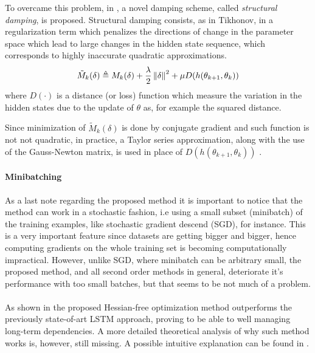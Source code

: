 To overcame this problem, in \cite{hessianFree}, a novel damping scheme, called \textit{structural damping}, is proposed.
Structural damping consists, as in Tikhonov, in a regularization term which  penalizes the directions of change in the parameter space which lead to large changes in the hidden state sequence, which corresponds to highly inaccurate quadratic approximations.
\begin{equation}
 \tilde{M}_k(\delta) \triangleq  M_k(\delta) + \frac{\lambda}{2} \left\Vert \delta \right\Vert^2 + \mu D(h(\theta_{k+1}, \theta_{k}))
\end{equation}
where $D(\cdot)$ is a distance (or loss) function which measure the variation in the hidden states due to the update of $\theta$ as, for example the squared distance.

Since minimization of $\tilde{M}_k(\delta)$ is done by conjugate gradient and such function is not not quadratic, in practice, a Taylor series approximation, along with the use of the Gauss-Newton matrix, is used in place of $D(h(\theta_{k+1}, \theta_{k}))$ .

\paragraph{Minibatching}
As a last note regarding the proposed method it is important to notice that the method can work in a stochastic fashion, 
i.e using a small subset (minibatch) of the training examples, like stochastic gradient descend (SGD), for instance. This 
is a very important feature since datasets are getting bigger and bigger, hence computing gradients on the whole training 
set is becoming computationally impractical. However, unlike SGD, where minibatch can be arbitrary small, the proposed 
method, and all second order methods in general, deteriorate it's performance with too small batches, but that seems to be not much of a problem.
\\\\
As shown in \cite{hessianFree} the proposed Hessian-free optimization method outperforms the previously 
state-of-art LSTM\cite{lstm} approach, proving to be able to well managing long-term dependencies. A more detailed 
theoretical analysis of why such method works is, however, still missing. A possible intuitive explanation can be found 
in \cite{advancesInOptimizingRnns,pascanu}. 
